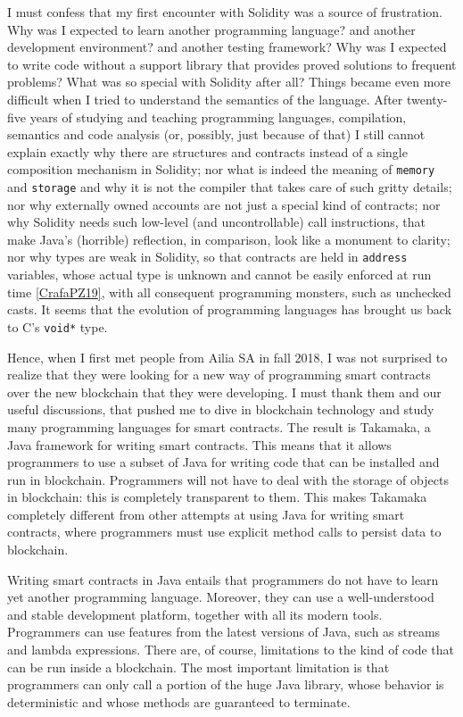 \documentclass[a4paper,]{book}
\begin{document}
{I must confess that my first encounter with Solidity was a source of
frustration. Why was I expected to learn another programming language?
and another development environment? and another testing framework? Why
was I expected to write code without a support library that provides
proved solutions to frequent problems? What was so special with Solidity
after all? Things became even more difficult when I tried to understand
the semantics of the language. After twenty-five years of studying and
teaching programming languages, compilation, semantics and code analysis
(or, possibly, just because of that) I still cannot explain exactly why
there are structures and contracts instead of a single composition
mechanism in Solidity; nor what is indeed the meaning of \texttt{memory}
and \texttt{storage} and why it is not the compiler that takes care of
such gritty details; nor why externally owned accounts are not just a
special kind of contracts; nor why Solidity needs such low-level (and
uncontrollable) call instructions, that make Java's (horrible)
reflection, in comparison, look like a monument to clarity; nor why
types are weak in Solidity, so that contracts are held in
\texttt{address} variables, whose actual type is unknown and cannot be
easily enforced at run time
\protect\hyperlink{CrafaPZ19}{{[}CrafaPZ19{]}}, with all consequent
programming monsters, such as unchecked casts. It seems that the
evolution of programming languages has brought us back to C's
\texttt{void*} type.

Hence, when I first met people from Ailia SA in fall 2018, I was not
surprised to realize that they were looking for a new way of programming
smart contracts over the new blockchain that they were developing. I
must thank them and our useful discussions, that pushed me to dive in
blockchain technology and study many programming languages for smart
contracts. The result is Takamaka, a Java framework for writing smart
contracts. This means that it allows programmers to use a subset of Java
for writing code that can be installed and run in blockchain.
Programmers will not have to deal with the storage of objects in
blockchain: this is completely transparent to them. This makes Takamaka
completely different from other attempts at using Java for writing smart
contracts, where programmers must use explicit method calls to persist
data to blockchain.

Writing smart contracts in Java entails that programmers do not have to
learn yet another programming language. Moreover, they can use a
well-understood and stable development platform, together with all its
modern tools. Programmers can use features from the latest versions of
Java, such as streams and lambda expressions. There are, of course,
limitations to the kind of code that can be run inside a blockchain. The
most important limitation is that programmers can only call a portion of
the huge Java library, whose behavior is deterministic and whose methods
are guaranteed to terminate.

}
\end{document}
